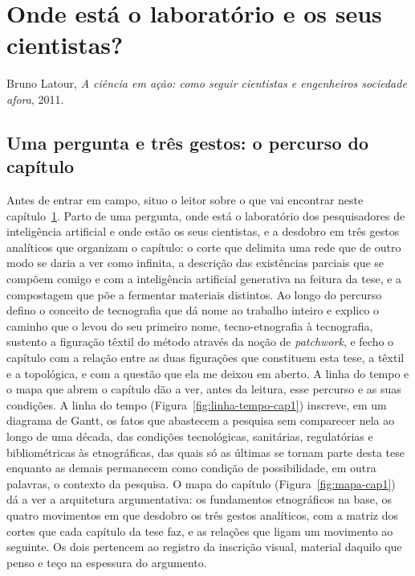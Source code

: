\renewcommand{\textbf}[1]{#1}

\chapter{Onde está o laboratório e os seus cientistas?}
\label{capitulo1}

%
{Bruno Latour, \textit{A ciência em ação: como seguir cientistas e engenheiros sociedade afora}, 2011.}

\section{Uma pergunta e três gestos: o percurso do capítulo}

Antes de entrar em campo, situo o leitor sobre o que vai encontrar neste capítulo~\ref{capitulo1}. Parto de uma pergunta, onde está o laboratório dos pesquisadores de inteligência artificial e onde estão os seus cientistas, e a desdobro em três gestos analíticos que organizam o capítulo: o corte que delimita uma rede que de outro modo se daria a ver como infinita, a descrição das existências parciais que se compõem comigo e com a inteligência artificial generativa na feitura da tese, e a compostagem que põe a fermentar materiais distintos. Ao longo do percurso defino o conceito de tecnografia que dá nome ao trabalho inteiro e explico o caminho que o levou do seu primeiro nome, tecno-etnografia à tecnografia, sustento a figuração têxtil do método através da noção de \textit{patchwork}, e fecho o capítulo com a relação entre as duas figurações que constituem esta tese, a têxtil e a topológica, e com a questão que ela me deixou em aberto. A linha do tempo e o mapa que abrem o capítulo dão a ver, antes da leitura, esse percurso e as suas condições. A linha do tempo (Figura~\ref{fig:linha-tempo-cap1}) inscreve, em um diagrama de Gantt, os fatos que abastecem a pesquisa sem comparecer nela ao longo de uma década, das condições tecnológicas, sanitárias, regulatórias e bibliométricas às etnográficas, das quais só as últimas se tornam parte desta tese enquanto as demais permanecem como condição de possibilidade, em outra palavras, o contexto da pesquisa. O mapa do capítulo (Figura~\ref{fig:mapa-cap1}) dá a ver a arquitetura argumentativa: os fundamentos etnográficos na base, os quatro movimentos em que desdobro os três gestos analíticos, com a matriz dos cortes que cada capítulo da tese faz, e as relações que ligam um movimento ao seguinte. Os dois pertencem ao registro da inscrição visual, material daquilo que penso e teço na espessura do argumento.

